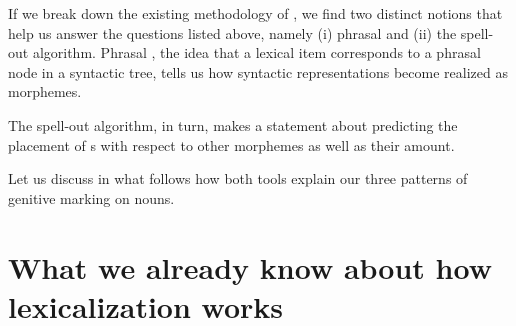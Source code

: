\begin{sloppypar}

If we break down the existing methodology of , we find two distinct notions that help us answer the questions listed above, namely (i) phrasal  and (ii) the spell-out algorithm. 
Phrasal , the idea that a lexical item corresponds to a phrasal node in a syntactic tree, tells us how syntactic representations become realized as morphemes. 
\par The spell-out algorithm, in turn, makes a statement about predicting the placement of s with respect to other morphemes as well as their amount.
\par
Let us discuss in what follows how both tools explain our three patterns of genitive marking on nouns. 



\section{What we already know about how lexicalization works}



\end{sloppypar}
